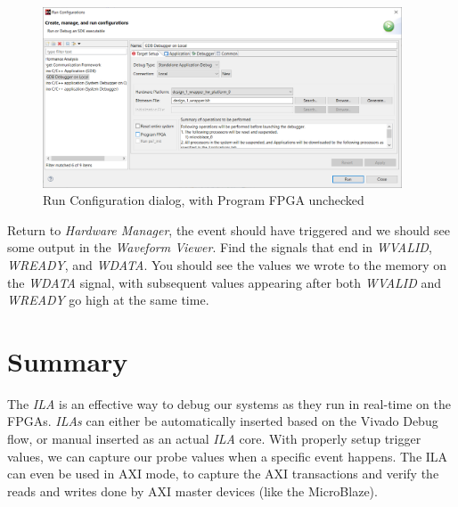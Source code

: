 \documentclass[11pt]{article}
\begin{document}
\begin{figure}[!h]
    \centering
    \includegraphics[width=0.95\textwidth]{images/run_config_program.png}
    \caption{Run Configuration dialog, with Program FPGA unchecked}
    \label{fig:run_config_program}
\end{figure}

Return to \textit{Hardware Manager}, the event should have triggered and we should see some output in the \textit{Waveform Viewer}. Find the signals that end in \textit{WVALID}, \textit{WREADY}, and \textit{WDATA}. You should see the values we wrote to the memory on the \textit{WDATA} signal, with subsequent values appearing after both \textit{WVALID} and \textit{WREADY} go high at the same time. 




\section{Summary}
\label{sec:summary}
The \textit{ILA} is an effective way to debug our systems as they run in real-time on the FPGAs. \textit{ILAs} can either be automatically inserted based on the Vivado Debug flow, or manual inserted as an actual \textit{ILA} core. With properly setup trigger values, we can capture our probe values when a specific event happens. The ILA can even be used in AXI mode, to capture the AXI transactions and verify the reads and writes done by AXI master devices (like the MicroBlaze).




\newpage
\printbibliography
\end{document}
